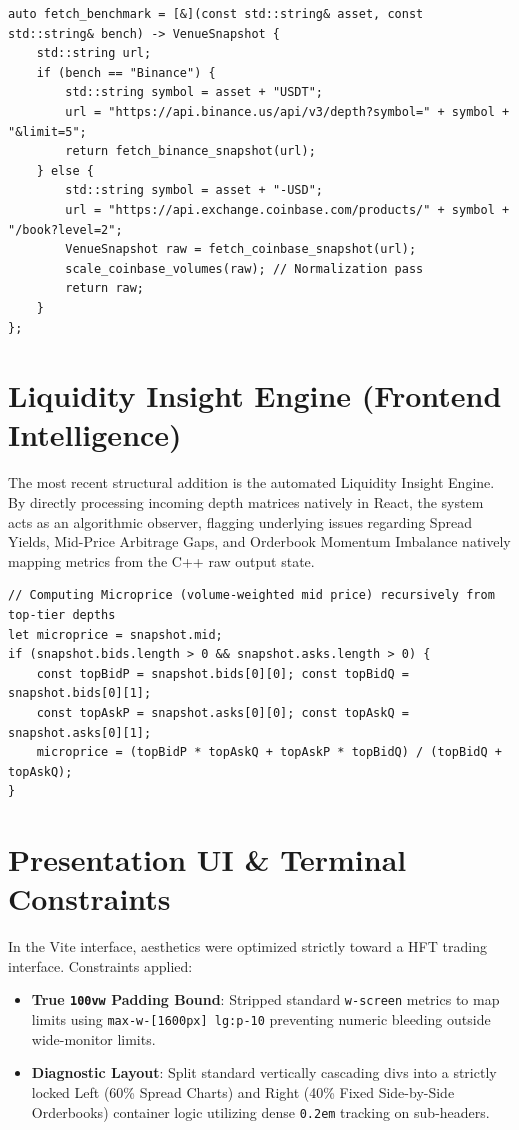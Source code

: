 \documentclass[10pt]{article}
\begin{document}
\begin{lstlisting}[caption=Dynamic Exchange Interpolation in C++]
auto fetch_benchmark = [&](const std::string& asset, const std::string& bench) -> VenueSnapshot {
    std::string url;
    if (bench == "Binance") {
        std::string symbol = asset + "USDT";
        url = "https://api.binance.us/api/v3/depth?symbol=" + symbol + "&limit=5";
        return fetch_binance_snapshot(url);
    } else {
        std::string symbol = asset + "-USD";
        url = "https://api.exchange.coinbase.com/products/" + symbol + "/book?level=2";
        VenueSnapshot raw = fetch_coinbase_snapshot(url);
        scale_coinbase_volumes(raw); // Normalization pass
        return raw;
    }
};
\end{lstlisting}

\section{Liquidity Insight Engine (Frontend Intelligence)}
The most recent structural addition is the automated Liquidity Insight Engine. By directly processing incoming depth matrices natively in React, the system acts as an algorithmic observer, flagging underlying issues regarding Spread Yields, Mid-Price Arbitrage Gaps, and Orderbook Momentum Imbalance natively mapping metrics from the C++ raw output state.

\begin{lstlisting}[caption=React Inference Computing Microprice]
// Computing Microprice (volume-weighted mid price) recursively from top-tier depths
let microprice = snapshot.mid;
if (snapshot.bids.length > 0 && snapshot.asks.length > 0) {
    const topBidP = snapshot.bids[0][0]; const topBidQ = snapshot.bids[0][1];
    const topAskP = snapshot.asks[0][0]; const topAskQ = snapshot.asks[0][1];
    microprice = (topBidP * topAskQ + topAskP * topBidQ) / (topBidQ + topAskQ);
}
\end{lstlisting}

\section{Presentation UI \& Terminal Constraints}
In the Vite interface, aesthetics were optimized strictly toward a HFT trading interface. Constraints applied:
\begin{itemize}
    \item \textbf{True \texttt{100vw} Padding Bound}: Stripped standard \texttt{w-screen} metrics to map limits using \texttt{max-w-[1600px] lg:p-10} preventing numeric bleeding outside wide-monitor limits.
    \item \textbf{Diagnostic Layout}: Split standard vertically cascading divs into a strictly locked Left (60\% Spread Charts) and Right (40\% Fixed Side-by-Side Orderbooks) container logic utilizing dense \texttt{0.2em} tracking on sub-headers.
\end{itemize}
\end{document}
